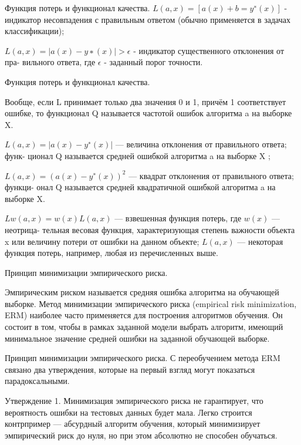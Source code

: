 \documentclass{beamer}
\begin{document}
\begin{frame}{Функция потерь и функционал качества.}
$ L (a, x) = [a(x) + b = y^∗ (x)]$ - индикатор несовпадения с правильным ответом
(обычно применяется в задачах классификации);


$L (a, x) = |a(x) − y ∗ (x)| > \epsilon$  - индикатор существенного отклонения от пра-
вильного ответа, где $\epsilon$ - заданный порог точности.


\end{frame}

\begin{frame}{Функция потерь и функционал качества.}

Вообще, если L принимает только два значения 0 и 1, причём 1 соответствует ошибке,
 то функционал Q называется частотой ошибок алгоритма a на выборке X.

$L (a, x) = |a(x) − y^∗ (x)|$ — величина отклонения от правильного ответа; функ-
ционал Q называется средней ошибкой алгоритма a на выборке X ;

$L (a, x) = (a(x)−y^∗ (x))^2$ — квадрат отклонения от правильного ответа; функци-
онал Q называется средней квадратичной ошибкой алгоритма a на выборке X.

$L w (a, x) = w(x)L (a, x)$ — взвешенная функция потерь, где $w(x)$ — неотрица-
тельная весовая функция, характеризующая степень важности объекта x или
величину потери от ошибки на данном объекте; $L (a, x)$ — некоторая функция
потерь, например, любая из перечисленных выше.


\end{frame}




 
\begin{frame}{Принцип минимизации эмпирического риска.}

Эмпирическим риском называется средняя ошибка алгоритма на обучающей выборке. Метод минимизации эмпирического риска (empirical risk minimization, ERM) наиболее часто применяется для построения алгоритмов обучения. Он состоит в том, чтобы в рамках заданной модели выбрать алгоритм, имеющий минимальное значение средней ошибки на заданной обучающей выборке.

\end{frame}

\begin{frame}{Принцип минимизации эмпирического риска.}
С переобучением метода ERM связано два утверждения, которые на первый взгляд могут показаться парадоксальными.

Утверждение 1. Минимизация эмпирического риска не гарантирует, что вероятность ошибки на тестовых данных будет мала. Легко строится контрпример — абсурдный алгоритм обучения, который минимизирует эмпирический риск до нуля, но при этом абсолютно не способен обучаться. 

\end{frame}
\end{document}
